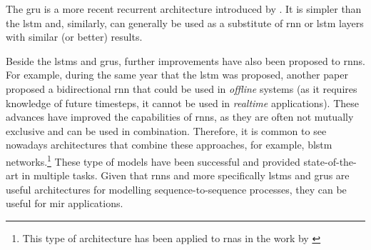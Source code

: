 

The \gls{gru} is a more recent recurrent architecture
introduced by \textcite{cho2014learning}. It is simpler than
the \gls{lstm} and, similarly, can generally be used as a
substitute of \gls{rnn} or \gls{lstm} layers with similar
(or better) results.

Beside the \glspl{lstm} and \glspl{gru}, further
improvements have also been proposed to \glspl{rnn}. For
example, during the same year that the \gls{lstm} was
proposed, another paper proposed a bidirectional \gls{rnn}
that could be used in \emph{offline} systems (as it requires
knowledge of future timesteps, it cannot be used in
\emph{realtime} applications). These advances have improved
the capabilities of \glspl{rnn}, as they are often not
mutually exclusive and can be used in combination.
Therefore, it is common to see nowadays architectures that
combine these approaches, for example, \gls{blstm}
networks.\footnote{This type of architecture has been
applied to \glspl{rna} in the work by
\textcite{chen2018functional}} These type of models have
been successful and provided state-of-the-art in multiple
tasks. Given that \glspl{rnn} and more specifically
\glspl{lstm} and \glspl{gru} are useful architectures for
modelling sequence-to-sequence processes, they can be useful
for \gls{mir} applications.
